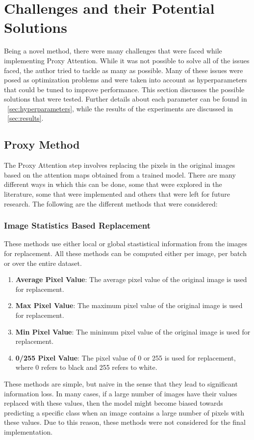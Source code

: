 \section{Challenges and their Potential Solutions}
Being a novel method, there were many challenges that were faced while implementing Proxy Attention. While it was not possible to solve all of the issues faced, the author tried to tackle as many as possible. Many of these issues were posed as optimization problems and were taken into account as hyperparameters that could be tuned to improve performance. This section discusses the possible solutions that were tested. Further details about each parameter can be found in ~\ref{sec:hyperparameters}, while the results of the experiments are discussed in ~\ref{sec:results}.
\subsection{Proxy Method}
The Proxy Attention step involves replacing the pixels in the original images based on the attention maps obtained from a trained model. There are many different ways in which this can be done, some that were explored in the literature, some that were implemented and others that were left for future research. The following are the different methods that were considered:
\subsubsection{Image Statistics Based Replacement}
These methods use either local or global stastistical information from the images for replacement. All these methods can be computed either per image, per batch or over the entire dataset.

\begin{enumerate}
    \item \textbf{Average Pixel Value}: The average pixel value of the original image is used for replacement.
    \item \textbf{Max Pixel Value}: The maximum pixel value of the original image is used for replacement.
    \item \textbf{Min Pixel Value}: The minimum pixel value of the original image is used for replacement.
    \item \textbf{0/255 Pixel Value}: The pixel value of 0 or 255 is used for replacement, where 0 refers to black and 255 refers to white.
\end{enumerate}
These methods are simple, but naive in the sense that they lead to significant information loss. In many cases, if a large number of images have their values replaced with these values, then the model might become biased towards predicting a specific class when an image contains a large number of pixels with these values.
Due to this reason, these methods were not considered for the final implementation.

